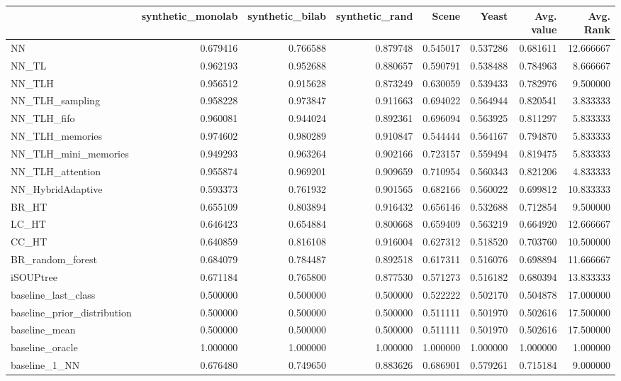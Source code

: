 \begin{tabular}{lrrrrrrr}
\toprule
 & synthetic_monolab & synthetic_bilab & synthetic_rand & Scene & Yeast & Avg. value & Avg. Rank \\
\midrule
NN & 0.679416 & 0.766588 & 0.879748 & 0.545017 & 0.537286 & 0.681611 & 12.666667 \\
NN_TL & 0.962193 & 0.952688 & 0.880657 & 0.590791 & 0.538488 & 0.784963 & 8.666667 \\
NN_TLH & 0.956512 & 0.915628 & 0.873249 & 0.630059 & 0.539433 & 0.782976 & 9.500000 \\
NN_TLH_sampling & 0.958228 & 0.973847 & 0.911663 & 0.694022 & 0.564944 & 0.820541 & 3.833333 \\
NN_TLH_fifo & 0.960081 & 0.944024 & 0.892361 & 0.696094 & 0.563925 & 0.811297 & 5.833333 \\
NN_TLH_memories & 0.974602 & 0.980289 & 0.910847 & 0.544444 & 0.564167 & 0.794870 & 5.833333 \\
NN_TLH_mini_memories & 0.949293 & 0.963264 & 0.902166 & 0.723157 & 0.559494 & 0.819475 & 5.833333 \\
NN_TLH_attention & 0.955874 & 0.969201 & 0.909659 & 0.710954 & 0.560343 & 0.821206 & 4.833333 \\
NN_HybridAdaptive & 0.593373 & 0.761932 & 0.901565 & 0.682166 & 0.560022 & 0.699812 & 10.833333 \\
BR_HT & 0.655109 & 0.803894 & 0.916432 & 0.656146 & 0.532688 & 0.712854 & 9.500000 \\
LC_HT & 0.646423 & 0.654884 & 0.800668 & 0.659409 & 0.563219 & 0.664920 & 12.666667 \\
CC_HT & 0.640859 & 0.816108 & 0.916004 & 0.627312 & 0.518520 & 0.703760 & 10.500000 \\
BR_random_forest & 0.684079 & 0.784487 & 0.892518 & 0.617311 & 0.516076 & 0.698894 & 11.666667 \\
iSOUPtree & 0.671184 & 0.765800 & 0.877530 & 0.571273 & 0.516182 & 0.680394 & 13.833333 \\
baseline_last_class & 0.500000 & 0.500000 & 0.500000 & 0.522222 & 0.502170 & 0.504878 & 17.000000 \\
baseline_prior_distribution & 0.500000 & 0.500000 & 0.500000 & 0.511111 & 0.501970 & 0.502616 & 17.500000 \\
baseline_mean & 0.500000 & 0.500000 & 0.500000 & 0.511111 & 0.501970 & 0.502616 & 17.500000 \\
baseline_oracle & 1.000000 & 1.000000 & 1.000000 & 1.000000 & 1.000000 & 1.000000 & 1.000000 \\
baseline_1_NN & 0.676480 & 0.749650 & 0.883626 & 0.686901 & 0.579261 & 0.715184 & 9.000000 \\
\bottomrule
\end{tabular}
